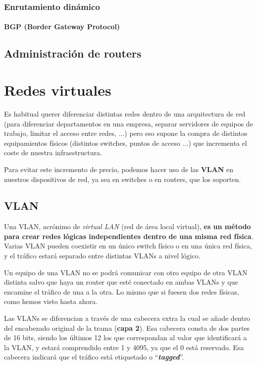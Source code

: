 \subsection{Enrutamiento dinámico}

\subsubsection{BGP (Border Gateway Protocol)}



\section{Administración de routers}









\chapter{Redes virtuales}
Es habitual querer diferenciar distintas redes dentro de una arquitectura de red (para diferenciar departamentos en una empresa, separar servidores de equipos de trabajo, limitar el acceso entre redes, ...) pero eso supone la compra de distintos equipamientos físicos (distintos switches, puntos de acceso ...) que incrementa el coste de nuestra infraestructura.

Para evitar este incremento de precio, podemos hacer uso de las \textbf{VLAN} en nuestros dispositivos de red, ya sea en switches o en routers, que los soporten.

\section{VLAN}
Una VLAN, acrónimo de \textit{virtual LAN} (red de área local virtual), \textbf{es un método para crear redes lógicas independientes dentro de una misma red física}. Varias VLAN pueden coexistir en un único switch físico o en una única red física, y el tráfico estará separado entre distintas VLANs a nivel lógico.

Un equipo de una VLAN no se podrá comunicar con otro equipo de otra VLAN distinta salvo que haya un router que esté conectado en ambas VLANs y que encamine el tráfico de una a la otra. Lo mismo que si fuesen dos redes físicas, como hemos visto hasta ahora.

Las VLANs se diferencian a través de una cabecera extra la cual se añade dentro del encabezado original de la trama (\textbf{capa 2}). Esa cabecera consta de dos partes de 16 bits, siendo los últimos 12 los que correspondan al valor que identificará a la VLAN, y estará comprendido entre 1 y 4095, ya que el 0 está reservado. Esa cabecera indicará que el tráfico está etiquetado o “\textit{\textbf{tagged}}”.


